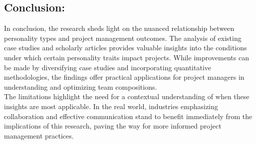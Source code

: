 \documentclass[a4Paper]{article}
\begin{document}
\subsection{Conclusion: } In conclusion, the research sheds light on the nuanced relationship between personality types and project management outcomes. The analysis of existing case studies and scholarly articles provides valuable insights into the conditions under which certain personality traits impact projects. While improvements can be made by diversifying case studies and incorporating quantitative methodologies, the findings offer practical applications for project managers in understanding and optimizing team compositions.\\

The limitations highlight the need for a contextual understanding of when these insights are most applicable. In the real world, industries emphasizing collaboration and effective communication stand to benefit immediately from the implications of this research, paving the way for more informed project management practices.
\pagebreak

\pagebreak
\end{document}
